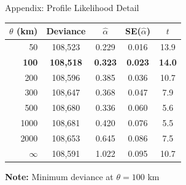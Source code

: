 \documentclass[aspectratio=169]{beamer}
\begin{document}
\begin{frame}{Appendix: Profile Likelihood Detail}

\begin{center}
\small
\begin{tabular}{rcccc}
\toprule
$\theta$ (km) & Deviance & $\hat{\alpha}$ & SE($\hat{\alpha}$) & $t$ \\
\midrule
50 & 108,523 & 0.229 & 0.016 & 13.9 \\
\textbf{100} & \textbf{108,518} & \textbf{0.323} & \textbf{0.023} & \textbf{14.0} \\
200 & 108,596 & 0.385 & 0.036 & 10.7 \\
300 & 108,647 & 0.368 & 0.047 & 7.9 \\
500 & 108,680 & 0.336 & 0.060 & 5.6 \\
1000 & 108,681 & 0.420 & 0.076 & 5.5 \\
2000 & 108,653 & 0.645 & 0.086 & 7.5 \\
$\infty$ & 108,591 & 1.022 & 0.095 & 10.7 \\
\bottomrule
\end{tabular}
\end{center}

\vspace{0.5em}

\textbf{Note:} Minimum deviance at $\theta = 100$ km

\end{frame}
\end{document}
